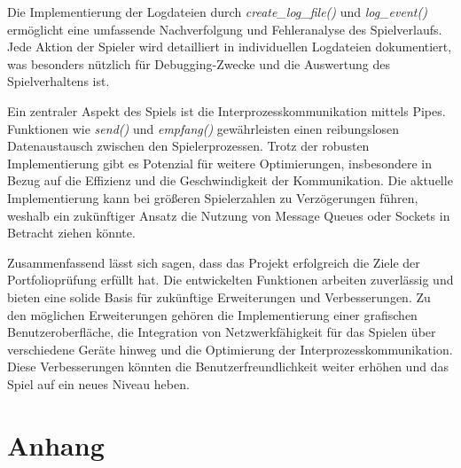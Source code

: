 \documentclass{llncs}
\begin{document}
Die Implementierung der Logdateien durch \textit{create\_log\_file()} und \textit{log\_event()} ermöglicht eine umfassende Nachverfolgung und Fehleranalyse des Spielverlaufs. Jede Aktion der Spieler wird detailliert in individuellen Logdateien dokumentiert, was besonders nützlich für Debugging-Zwecke und die Auswertung des Spielverhaltens ist.

Ein zentraler Aspekt des Spiels ist die Interprozesskommunikation mittels Pipes. Funktionen wie \textit{send()} und \textit{empfang()} gewährleisten einen reibungslosen Datenaustausch zwischen den Spielerprozessen. Trotz der robusten Implementierung gibt es Potenzial für weitere Optimierungen, insbesondere in Bezug auf die Effizienz und die Geschwindigkeit der Kommunikation. Die aktuelle Implementierung kann bei größeren Spielerzahlen zu Verzögerungen führen, weshalb ein zukünftiger Ansatz die Nutzung von Message Queues oder Sockets in Betracht ziehen könnte.

Zusammenfassend lässt sich sagen, dass das Projekt erfolgreich die Ziele der Portfolioprüfung erfüllt hat. Die entwickelten Funktionen arbeiten zuverlässig und bieten eine solide Basis für zukünftige Erweiterungen und Verbesserungen. Zu den möglichen Erweiterungen gehören die Implementierung einer grafischen Benutzeroberfläche, die Integration von Netzwerkfähigkeit für das Spielen über verschiedene Geräte hinweg und die Optimierung der Interprozesskommunikation. Diese Verbesserungen könnten die Benutzerfreundlichkeit weiter erhöhen und das Spiel auf ein neues Niveau heben.

\section{Anhang}
\end{document}
